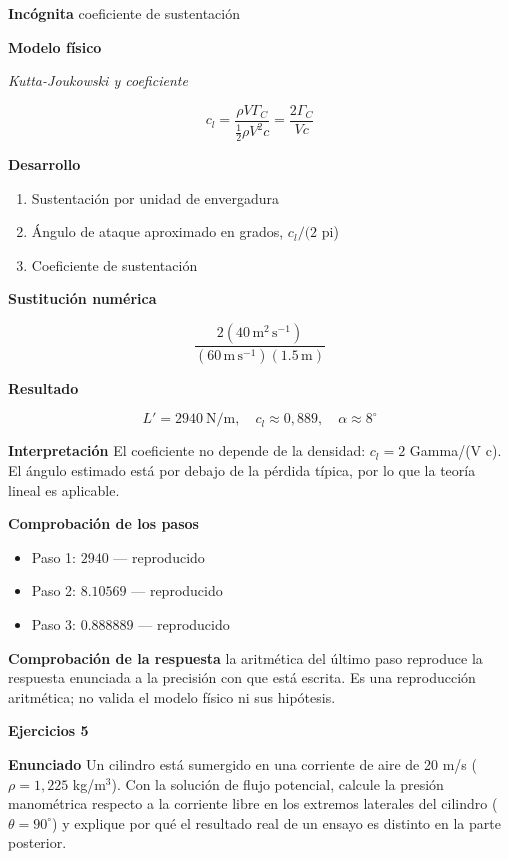 \documentclass[10pt,openany]{book}
\begin{document}
\noindent\textbf{Incógnita}
coeficiente de sustentación

\noindent\textbf{Modelo físico}

\noindent\textit{Kutta-Joukowski y coeficiente}

\[
c_l = \frac{\rho V\Gamma_C}{\tfrac12\rho V^{2} c} = \frac{2\Gamma_C}{V c}
\]

\noindent\textbf{Desarrollo}
\begin{enumerate}
\item
Sustentación por unidad de envergadura
\item
Ángulo de ataque aproximado en grados, \(c_l/(2\) pi)
\item
Coeficiente de sustentación
\end{enumerate}

\noindent\textbf{Sustitución numérica}

\[
\frac{2 \left(40\,\mathrm{m}^{2}\,\mathrm{s}^{-1}\right)}{\left(60\,\mathrm{m}\,\mathrm{s}^{-1}\right) \left(1.5\,\mathrm{m}\right)}
\]

\noindent\textbf{Resultado}

\[
L' = 2940\ \mathrm{N/m},\quad c_l \approx 0{,}889,\quad \alpha \approx 8^{\circ}
\]

\noindent\textbf{Interpretación}
El coeficiente no depende de la densidad: \(c_l = 2\) Gamma/(V c). El ángulo estimado está por debajo de la pérdida típica, por lo que la teoría lineal es aplicable.

\noindent\textbf{Comprobación de los pasos}
\begin{itemize}
\item Paso 1: $2940$ — reproducido
\item Paso 2: $8.10569$ — reproducido
\item Paso 3: $0.888889$ — reproducido
\end{itemize}

\noindent\textbf{Comprobación de la respuesta} la aritmética del último paso reproduce la respuesta enunciada a la precisión con que está escrita. Es una reproducción aritmética; no valida el modelo físico ni sus hipótesis.

\noindent\textbf{Ejercicios 5}

\noindent\textbf{Enunciado}
Un cilindro está sumergido en una corriente de aire de 20 m/s (\(\rho = 1{,}225\) kg/m\(^3\)). Con la solución de flujo potencial, calcule la presión manométrica respecto a la corriente libre en los extremos laterales del cilindro (\(\theta = 90^\circ\)) y explique por qué el resultado real de un ensayo es distinto en la parte posterior.
\end{document}
